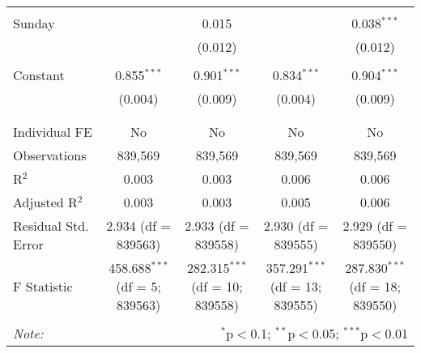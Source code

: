 \documentclass[
]{article}
\begin{document}
\begin{table}[!htbp]
{\begin{tabular}{@{\extracolsep{5pt}}lcccc}
  & & & & \\ 
 Sunday &  & 0.015 &  & 0.038$^{***}$ \\ 
  &  & (0.012) &  & (0.012) \\ 
  & & & & \\ 
 Constant & 0.855$^{***}$ & 0.901$^{***}$ & 0.834$^{***}$ & 0.904$^{***}$ \\ 
  & (0.004) & (0.009) & (0.004) & (0.009) \\ 
  & & & & \\ 
\hline \\[-1.8ex] 
Individual FE & No & No & No & No \\ 
Observations & 839,569 & 839,569 & 839,569 & 839,569 \\ 
R$^{2}$ & 0.003 & 0.003 & 0.006 & 0.006 \\ 
Adjusted R$^{2}$ & 0.003 & 0.003 & 0.005 & 0.006 \\ 
Residual Std. Error & 2.934 (df = 839563) & 2.933 (df = 839558) & 2.930 (df = 839555) & 2.929 (df = 839550) \\ 
F Statistic & 458.688$^{***}$ (df = 5; 839563) & 282.315$^{***}$ (df = 10; 839558) & 357.291$^{***}$ (df = 13; 839555) & 287.830$^{***}$ (df = 18; 839550) \\ 
\hline 
\hline \\[-1.8ex] 
\textit{Note:}  & \multicolumn{4}{r}{$^{*}$p$<$0.1; $^{**}$p$<$0.05; $^{***}$p$<$0.01} \\ 
\end{tabular}
} 
\end{table} 
\newpage
\end{document}
